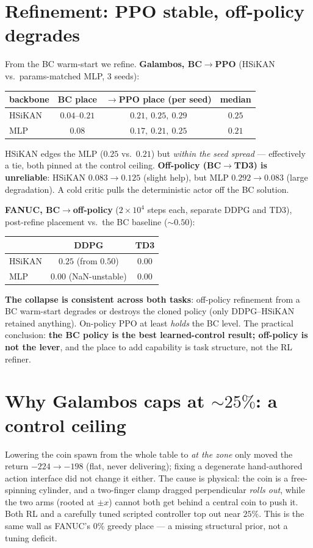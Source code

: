 \documentclass[11pt]{article}
\begin{document}
\section{Refinement: PPO stable, off-policy degrades}
From the BC warm-start we refine. \textbf{Galambos, BC$\to$PPO} (HSiKAN vs.\ params-matched MLP, 3 seeds):
\begin{center}\small
\begin{tabular}{lccc}
\toprule
backbone & BC place & \textbf{$\to$PPO place} (per seed) & median \\
\midrule
HSiKAN & $0.04$--$0.21$ & $0.21,\ 0.25,\ 0.29$ & $\mathbf{0.25}$ \\
MLP    & $0.08$         & $0.17,\ 0.21,\ 0.25$ & $\mathbf{0.21}$ \\
\bottomrule
\end{tabular}
\end{center}
HSiKAN edges the MLP ($0.25$ vs.\ $0.21$) but \emph{within the seed spread} --- effectively a tie, both pinned at
the control ceiling. \textbf{Off-policy (BC$\to$TD3) is unreliable}: HSiKAN $0.083\!\to\!0.125$ (slight help), but
MLP $0.292\!\to\!0.083$ (large degradation). A cold critic pulls the deterministic actor off the BC solution.

\textbf{FANUC, BC$\to$off-policy} ($2\times10^4$ steps each, separate DDPG and TD3), post-refine placement vs.\
the BC baseline ($\sim 0.50$):
\begin{center}\small
\begin{tabular}{lcc}
\toprule
 & DDPG & TD3 \\
\midrule
HSiKAN & $0.25$ (from $0.50$) & $0.00$ \\
MLP    & $0.00$ (NaN-unstable) & $0.00$ \\
\bottomrule
\end{tabular}
\end{center}
\textbf{The collapse is consistent across both tasks}: off-policy refinement from a BC warm-start degrades or
destroys the cloned policy (only DDPG--HSiKAN retained anything). On-policy PPO at least \emph{holds} the BC
level. The practical conclusion: \textbf{the BC policy is the best learned-control result; off-policy is not the
lever}, and the place to add capability is task structure, not the RL refiner.

\section{Why Galambos caps at \texorpdfstring{$\sim 25\%$}{~25\%}: a control ceiling}
Lowering the coin spawn from the whole table to \emph{at the zone} only moved the return $-224\to-198$ (flat,
never delivering); fixing a degenerate hand-authored action interface did not change it either. The cause is
physical: the coin is a free-spinning cylinder, and a two-finger clamp dragged perpendicular \emph{rolls out},
while the two arms (rooted at $\pm x$) cannot both get behind a central coin to push it. Both RL and a carefully
tuned scripted controller top out near $25\%$. This is the same wall as FANUC's $0\%$ greedy place --- a missing
structural prior, not a tuning deficit.
\end{document}
